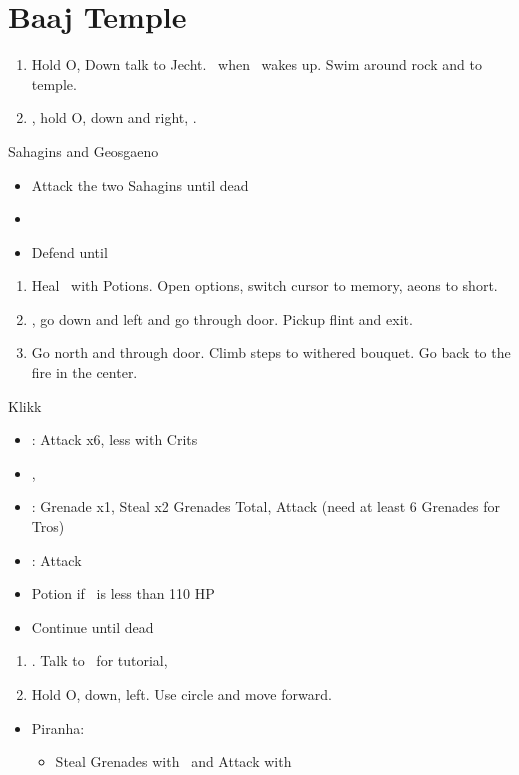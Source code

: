 \chapter{Baaj Temple}

\begin{enumerate}
	\item Hold O, Down talk to Jecht. \sd \ when \tidus \ wakes up. Swim around rock and to temple.
	\item \cs, hold O, down and right, \cs.
\end{enumerate}
\begin{battle}{Sahagins and Geosgaeno}
	\begin{itemize}
		\item Attack the two Sahagins until dead
		\item \cs[0:30]
		\item Defend until \cs
	\end{itemize}
\end{battle}
\begin{enumerate}[resume]
	\item Heal \tidus \ with Potions. Open options, switch cursor to memory, aeons to short.
	\item \cs, go down and left and go through door. Pickup flint and exit.
	\item Go north and through door. Climb steps to withered bouquet. Go back to the fire in the center. \cs[2:10]
\end{enumerate}
\begin{battle}[1500]{Klikk}
	\begin{itemize}
		\item \tidus: Attack x6, less with Crits
		\item \cs, \sd
		\item \rikku: Grenade x1, Steal x2 Grenades Total, Attack (need at least 6 Grenades for Tros)
		\item \tidus: Attack
		\item Potion if \tidus \ is less than 110 HP
		\item Continue until dead
	\end{itemize}
\end{battle}
\begin{enumerate}[resume]
	\item \cs[2:30]. Talk to \rikku \ for tutorial, \sd
	\item Hold O, down, left. Use circle and move forward.
\end{enumerate}
\begin{encounters}
	\begin{itemize}
		\item Piranha:
		      \begin{itemize}
			      \item Steal Grenades with \rikku \ and Attack with \tidus
		      \end{itemize}
	\end{itemize}
\end{encounters}
